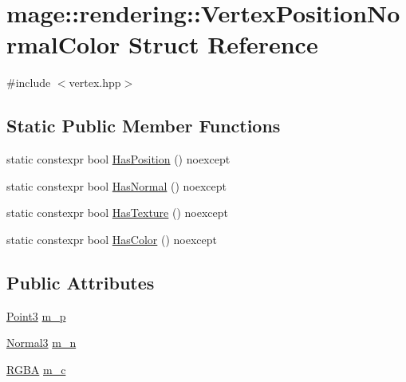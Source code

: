 \hypertarget{structmage_1_1rendering_1_1_vertex_position_normal_color}{}\section{mage\+:\+:rendering\+:\+:Vertex\+Position\+Normal\+Color Struct Reference}
\label{structmage_1_1rendering_1_1_vertex_position_normal_color}


{\ttfamily \#include $<$vertex.\+hpp$>$}

\subsection*{Static Public Member Functions}
\begin{DoxyCompactItemize}
\item 
static constexpr bool \mbox{\hyperlink{structmage_1_1rendering_1_1_vertex_position_normal_color_a1a40ced9702b3aa3a8f32ea932448aa1}{Has\+Position}} () noexcept
\item 
static constexpr bool \mbox{\hyperlink{structmage_1_1rendering_1_1_vertex_position_normal_color_a663883aaff79837d1abb1c5cb54d2340}{Has\+Normal}} () noexcept
\item 
static constexpr bool \mbox{\hyperlink{structmage_1_1rendering_1_1_vertex_position_normal_color_aef3b7dd4f11d7f2a78fe29c49b8bf6f5}{Has\+Texture}} () noexcept
\item 
static constexpr bool \mbox{\hyperlink{structmage_1_1rendering_1_1_vertex_position_normal_color_ae1d38a1d2e3f546c475849ec360f5317}{Has\+Color}} () noexcept
\end{DoxyCompactItemize}
\subsection*{Public Attributes}
\begin{DoxyCompactItemize}
\item 
\mbox{\hyperlink{structmage_1_1_point3}{Point3}} \mbox{\hyperlink{structmage_1_1rendering_1_1_vertex_position_normal_color_ad89961e1a0b0bd97f580a34709e4e05f}{m\+\_\+p}}
\item 
\mbox{\hyperlink{structmage_1_1_normal3}{Normal3}} \mbox{\hyperlink{structmage_1_1rendering_1_1_vertex_position_normal_color_abf35d5cb0057f76dbd6f153ee0f412f4}{m\+\_\+n}}
\item 
\mbox{\hyperlink{structmage_1_1_r_g_b_a}{R\+G\+BA}} \mbox{\hyperlink{structmage_1_1rendering_1_1_vertex_position_normal_color_a41410eb9dab6e73b59aac40b69637c05}{m\+\_\+c}}
\end{DoxyCompactItemize}
